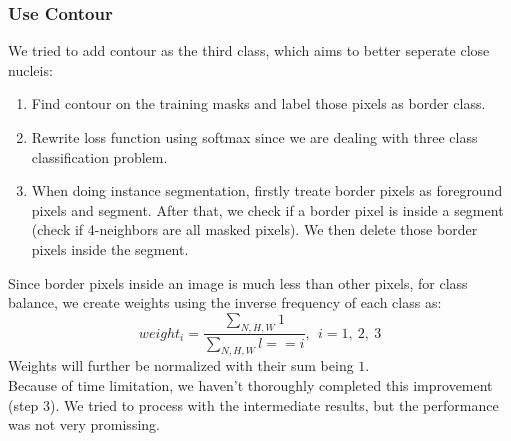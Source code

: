 \documentclass[runningheads]{llncs}
\begin{document}
\subsubsection{Use Contour} We tried to add contour as the third class, which aims to better seperate close nucleis:
\begin{enumerate}
	\item Find contour on the training masks and label those pixels as border class.
	\item Rewrite loss function using softmax since we are dealing with three class classification problem.
	\item When doing instance segmentation, firstly treate border pixels as foreground pixels and segment. After that, we check if a border pixel is inside a segment (check if 4-neighbors are all masked pixels). We then delete those border pixels inside the segment.
\end{enumerate}
Since border pixels inside an image is much less than other pixels, for class balance, we create weights using the inverse frequency of each class as:
$$
weight_i = \frac{\sum_{N,H,W}1}{\sum_{N,H,W}l==i},\ \ i=1,\ 2,\ 3
$$
Weights will further be normalized with their sum being $1$.\\
Because of time limitation, we haven't thoroughly completed this improvement (step $3$). We tried to process with the intermediate results, but the performance was not very promissing.


%
\end{document}
